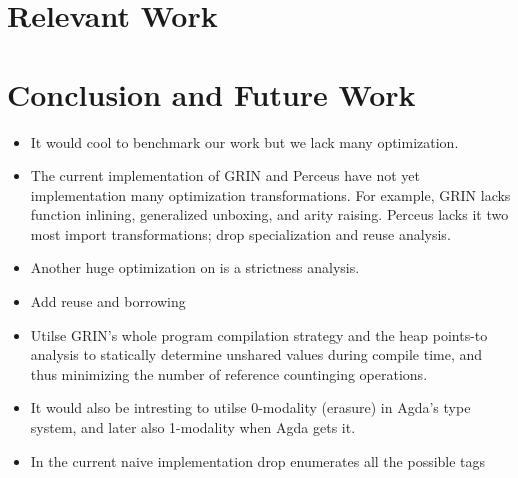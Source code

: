 \documentclass[10pt, twocolumn]{article}
\begin{document}
\section{Relevant Work}

\section{Conclusion and Future Work}
\begin{itemize}
\item It would cool to benchmark our work but we lack many optimization.
\item The current implementation of GRIN and Perceus have not yet implementation many optimization transformations. For example, GRIN lacks function inlining, generalized unboxing, and arity raising. Perceus lacks it two most import transformations; drop specialization and reuse analysis.
\item Another huge optimization on is a strictness analysis. 
\item Add reuse and borrowing
\item Utilse GRIN's whole program compilation strategy and the heap points-to analysis to statically determine unshared values during compile time, and thus minimizing the number of reference countinging operations.
\item It would also be intresting to utilse 0-modality (erasure) in Agda's type system, and later also 1-modality when Agda gets it.
\item In the current naive implementation drop enumerates all the possible tags 
\end{itemize}



\printbibliography
\end{document}
